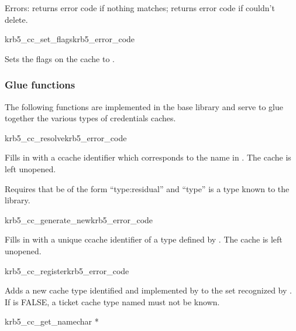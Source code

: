 Errors: returns error code if nothing matches; returns error code if
couldn't delete.

\begin{funcdecl}{krb5_cc_set_flags}{krb5_error_code}{\funcin}
\end{funcdecl}

Sets the flags on the cache  to .


\subsubsection{Glue functions}
The following functions are implemented in the base library and serve to
glue together the various types of credentials caches.


\begin{funcdecl}{krb5_cc_resolve}{krb5_error_code}{\funcin}
\funcout
{}
\end{funcdecl}

Fills in  with a ccache identifier which corresponds to
the name in .  The cache is left unopened.

Requires that  be of the form ``type:residual'' and
``type'' is a type known to the library.

\begin{funcdecl}{krb5_cc_generate_new}{krb5_error_code}{\funcin}
\funcout
{}
\end{funcdecl}


Fills in  with a unique ccache identifier of a type defined by
.  The cache is left unopened.

\begin{funcdecl}{krb5_cc_register}{krb5_error_code}{\funcin}
\end{funcdecl}

Adds a new cache type identified and implemented by  to
the set recognized by .
If  is FALSE, a ticket cache type named
 must not be known.

\begin{funcdecl}{krb5_cc_get_name}{char *}{\funcin}
\end{funcdecl}

